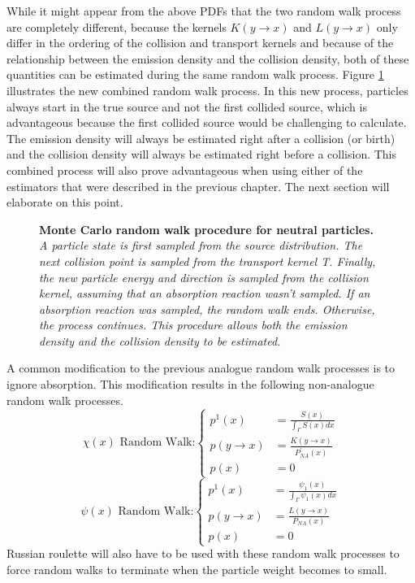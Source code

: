 While it might appear from the above PDFs that the two random walk process are 
completely different, because the kernels $K(y \to x)$ and $L(y \to x)$ only 
differ in the ordering of the collision and transport kernels and because of 
the relationship between the emission density and the collision density, both 
of these quantities can be estimated during the same random walk process. 
Figure \ref{fig:combined_random_walk_process} illustrates the new combined 
random walk process. In this new process, particles always start in the true 
source and not the first collided source, which is advantageous because the 
first collided source would be challenging to calculate. The emission density 
will always be estimated right after a collision (or birth) and the collision
density will always be estimated right before a collision. This combined 
process will also prove advantageous when using either of the estimators
that were described in the previous chapter. The next section will elaborate
on this point.
\begin{figure}[t!]
  \begin{center}
    \end{center}
  \caption{\textbf{Monte Carlo random walk procedure for neutral particles.}
    \textit{A particle state is first sampled from the source distribution. The
      next collision point is sampled from the transport kernel T. Finally,
      the new particle energy and direction is sampled from the collision
      kernel, assuming that an absorption reaction wasn't sampled. If an
      absorption reaction was sampled, the random walk ends. Otherwise, the
      process continues. This procedure allows both the emission density and 
      the collision density to be estimated.}}
  \label{fig:combined_random_walk_process}
\end{figure}

A common modification to the previous analogue random walk processes is to 
ignore absorption. This modification results in the following non-analogue
random walk processes.  
\begin{equation}
  \chi(x)\text{ Random Walk:}
  \begin{cases}
    p^1(x) & = \frac{S(x)}{\int_{\Gamma} S(x)dx} \\
    p(y \to x) &  = \frac{K(y \to x)}{P_{NA}^{'}(x)} \\
    p(x) & = 0
  \end{cases}
  \label{eq:mc_random_walk_emission_dens_nonan}
\end{equation}
\begin{equation}
  \psi(x)\text{ Random Walk:}
  \begin{cases}
    p^1(x) & = \frac{\psi_1(x)}{\int_{\Gamma}\psi_1(x)dx} \\
    p(y \to x) & = \frac{L(y \to x)}{P_{NA}(x)} \\
    p(x) & = 0
  \end{cases}
  \label{eq:mc_random_walk_collision_dens_nonan}
\end{equation}
Russian roulette will also have to be used with these random walk processes to 
force random walks to terminate when the particle weight becomes to small. 

